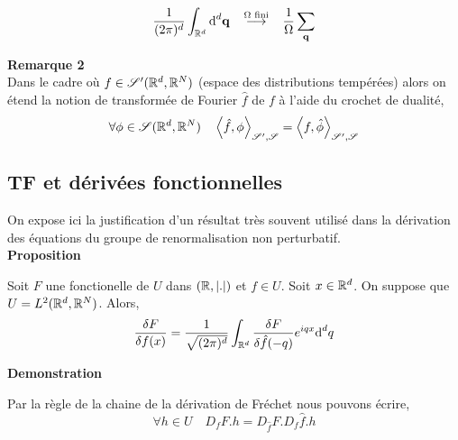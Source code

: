 \documentclass[10pt]{article}
\begin{document}
\begin{multicols}{2}
\begin{equation}
  \frac{1}{(2\pi)^d} \int_{\mathbb{R}^d} \text{d}^d {\bf q} \overset{\text{$\Omega$ fini}}{\quad \longrightarrow \quad } \frac{1}{\Omega} \sum_{{\bf q}}
\end{equation}


\textbf{Remarque 2} \\
Dans le cadre où $f \in \mathscr{S}'(\mathbb{R}^d, \mathbb{R}^N)$ (espace des distributions tempérées) alors on étend la notion de transformée de Fourier $\hat{f}$ de $f$ à l'aide du crochet de dualité, 
\begin{equation}
  \forall \phi \in \mathscr{S}(\mathbb{R}^d, \mathbb{R}^N) \quad \left< \hat{f}, \phi \right>_{\mathscr{S}', \mathscr{S}} = \left< f, \hat{\phi} \right>_{\mathscr{S}', \mathscr{S}}
\end{equation}

\vspace*{11pt}







\vspace*{11pt}

\subsection{TF et dérivées fonctionnelles}


On expose ici la justification d'un résultat très souvent utilisé dans la dérivation des équations du groupe de renormalisation non perturbatif.\\ 

\textbf{Proposition}

Soit $F$ une fonctionelle de $U$ dans $(\mathbb{R},|.|)$ et $f \in U$.
Soit $x \in \mathbb{R}^d$. On suppose que $U = L^2(\mathbb{R}^d, \mathbb{R}^N)$. 
Alors, 
\begin{equation}
  \frac{\delta F}{\delta f(x)} = \frac{1}{\sqrt{(2\pi)^d}} \int_{\mathbb{R}^d} \frac{\delta F}{\delta \hat{f}(-q)} e^{iqx} \text{d}^d q
\end{equation} 


\vspace*{11pt}
\textbf{Demonstration}

Par la règle de la chaine de la dérivation de Fréchet nous pouvons écrire, 
\begin{equation}
  \forall h \in U \quad D_fF.h = D_{\hat{f}}F. D_f \hat{f}.h
\end{equation}




\end{multicols}
\end{document}
